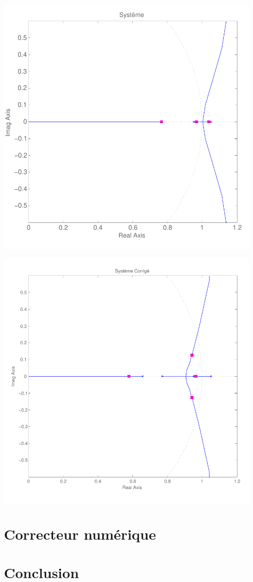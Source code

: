 \documentclass[11pt, french]{article} %
\begin{document}
\includegraphics[scale=0.50]{RLN_Sys_Seul.pdf}

\includegraphics[scale=0.50]{RLN_Sys_AvPh_K5.pdf}

\section{Correcteur numérique}
\section{Conclusion}
\end{document}
